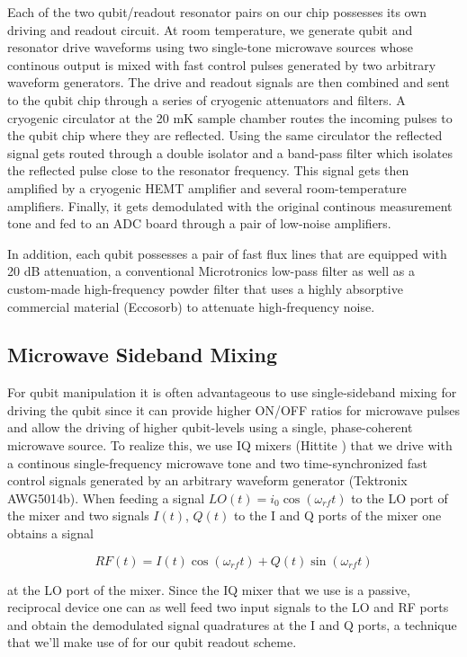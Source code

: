 Each of the two qubit/readout resonator pairs on our chip possesses its own driving and readout circuit. At room temperature, we generate qubit and resonator drive waveforms using two single-tone microwave sources whose continous output is mixed with fast control pulses generated by two arbitrary waveform generators. The drive and readout signals are then combined and sent to the qubit chip through a series of cryogenic attenuators and filters. A cryogenic circulator at the 20 mK sample chamber routes the incoming pulses to the qubit chip where they are reflected. Using the same circulator the reflected signal gets routed through a double isolator and a band-pass filter which isolates the reflected pulse close to the resonator frequency. This signal gets then amplified by a cryogenic HEMT amplifier and several room-temperature amplifiers. Finally, it gets demodulated with the original continous measurement tone and fed to an ADC board through a pair of low-noise amplifiers.

In addition, each qubit possesses a pair of fast flux lines that are equipped with 20 dB attenuation, a conventional Microtronics low-pass filter as well as a custom-made high-frequency powder filter that uses a highly absorptive commercial material (Eccosorb) to attenuate high-frequency noise.

\subsection{Microwave Sideband Mixing}

For qubit manipulation it is often advantageous to use single-sideband mixing for driving the qubit since it can provide higher ON/OFF ratios for microwave pulses and allow the driving of higher qubit-levels using a single, phase-coherent microwave source. To realize this, we use IQ mixers (Hittite ) that we drive with a continous single-frequency microwave tone and two time-synchronized fast control signals generated by an arbitrary waveform generator (Tektronix AWG5014b). When feeding a signal $LO(t) = i_0 \cos{(\omega_{rf} t )}$ to the LO port of the mixer and two signals $I(t)$, $Q(t)$ to the I and Q ports of the mixer one obtains a signal

\begin{equation}
RF(t) = I(t)\cos{(\omega_{rf} t)}+Q(t)\sin{(\omega_{rf} t)} \label{eq:iqMixer}
\end{equation}

at the LO port of the mixer. Since the IQ mixer that we use is a passive, reciprocal device one can as well feed two input signals to the LO and RF ports and obtain the demodulated signal quadratures at the I and Q ports, a technique that we'll make use of for our qubit readout scheme.

